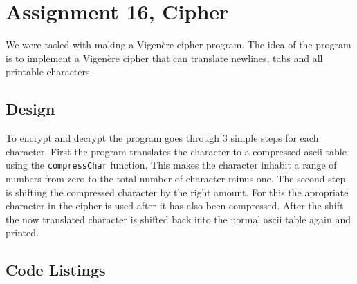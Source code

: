 \documentclass[a4paper]{article}
\begin{document}
\section*{Assignment 16, Cipher}
We were tasled with making a Vigenère cipher program.
The idea of the program is to implement a Vigenère cipher that can translate newlines, tabs and all printable characters.

\subsection*{Design}
To encrypt and decrypt the program goes through 3 simple steps for each character.
First the program translates the character to a compressed ascii table using the \texttt{compressChar} function.
This makes the character inhabit a range of numbers from zero to the total number of character minus one.
The second step is shifting the compressed character by the right amount.
For this the apropriate character in the cipher is used after it has also been compressed.
After the shift the now translated character is shifted back into the normal ascii table again and printed.

\subsection*{Code Listings}






\end{document}
